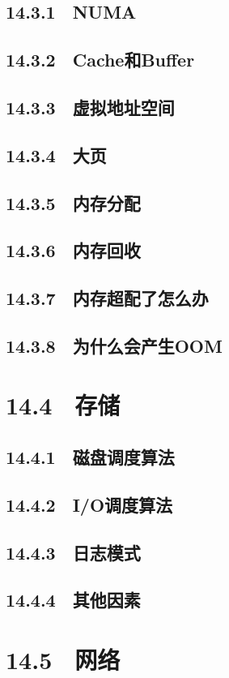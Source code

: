 \documentclass[12pt,UTF8]{ctexbook}
\begin{document}
{\subsection{14.3.1　NUMA}
\subsection{14.3.2　Cache和Buffer}
\subsection{14.3.3　虚拟地址空间}
\subsection{14.3.4　大页}
\subsection{14.3.5　内存分配}
\subsection{14.3.6　内存回收}
\subsection{14.3.7　内存超配了怎么办}
\subsection{14.3.8　为什么会产生OOM}
\section{14.4　存储}
\subsection{14.4.1　磁盘调度算法}
\subsection{14.4.2　I/O调度算法}
\subsection{14.4.3　日志模式}
\subsection{14.4.4　其他因素}
\section{14.5　网络}
}
\end{document}
